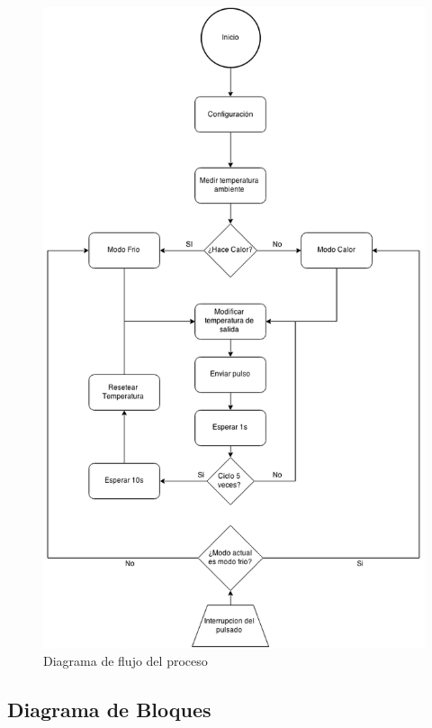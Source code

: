 \documentclass[10pt,spanish,a4paper,openany,notitlepage]{article}
\begin{document}
\begin{figure}[H] %
\begin{center}
\includegraphics[scale=0.6]{./imagenes/diagrama_de_flujo.png}
\caption{Diagrama de flujo del proceso}
 \label{fig:diag_flujo}
\end{center}
\end{figure}

\subsection{Diagrama de Bloques}
\end{document}
